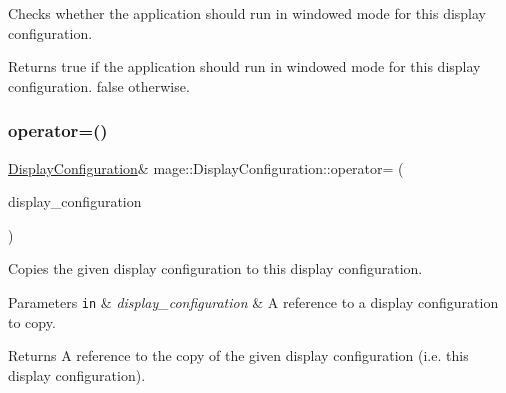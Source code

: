 Checks whether the application should run in windowed mode for this display configuration.

\begin{DoxyReturn}{Returns}
{\ttfamily true} if the application should run in windowed mode for this display configuration. {\ttfamily false} otherwise. 
\end{DoxyReturn}
\hypertarget{structmage_1_1_display_configuration_a43d4997e418b27add46442e88ba3672b}{}\label{structmage_1_1_display_configuration_a43d4997e418b27add46442e88ba3672b} 
\subsubsection{\texorpdfstring{operator=()}{operator=()}\hspace{0.1cm}{\footnotesize\ttfamily [1/2]}}
{\footnotesize\ttfamily \hyperlink{structmage_1_1_display_configuration}{Display\+Configuration}\& mage\+::\+Display\+Configuration\+::operator= (\begin{DoxyParamCaption}\item[{const \hyperlink{structmage_1_1_display_configuration}{Display\+Configuration} \&}]{display\+\_\+configuration }\end{DoxyParamCaption})\hspace{0.3cm}{\ttfamily [default]}}

Copies the given display configuration to this display configuration.


\begin{DoxyParams}[1]{Parameters}
\mbox{\tt in}  & {\em display\+\_\+configuration} & A reference to a display configuration to copy. \\
\hline
\end{DoxyParams}
\begin{DoxyReturn}{Returns}
A reference to the copy of the given display configuration (i.\+e. this display configuration). 
\end{DoxyReturn}
\hypertarget{structmage_1_1_display_configuration_ab3815acd7ca14ea9d6c7631bbf66469a}{}\label{structmage_1_1_display_configuration_ab3815acd7ca14ea9d6c7631bbf66469a} 
